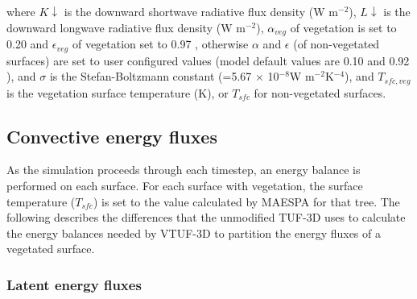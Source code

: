 \documentclass[final,3p,times,authoryear]{elsarticle}
\begin{document}
where $K\downarrow$ is the downward shortwave radiative flux density (W m$^{-2}$), $L\downarrow$ is the downward longwave radiative flux density (W m$^{-2}$), $\alpha _{veg}$ of vegetation is set to 0.20 and $\epsilon _{veg}$ of vegetation set to 0.97 \citep[p. 12]{Oke1987z}, otherwise $\alpha$ and $\epsilon$ (of non-vegetated surfaces) are set to user configured values (model default values are 0.10 and 0.92 \citep{Krayenhoff2007}), and $\sigma$ is the Stefan-Boltzmann constant (=5.67 $\times$ 10$^{-8}$W m$^{-2}$K$^{-4}$), and $T_{sfc,veg}$ is the vegetation surface temperature (K), or $T_{sfc}$ for non-vegetated surfaces.



\subsection{Convective energy fluxes}

As the simulation proceeds through each timestep, an energy balance is performed on each surface. For each surface with vegetation, the surface temperature ($T_{sfc}$) is set to the value calculated by MAESPA for that tree. The following describes the differences that the unmodified TUF-3D uses to calculate the energy balances needed by VTUF-3D to partition the energy fluxes of a vegetated surface.

\subsubsection{Latent energy fluxes}
\label{sec:calcleaftemp}
\end{document}
